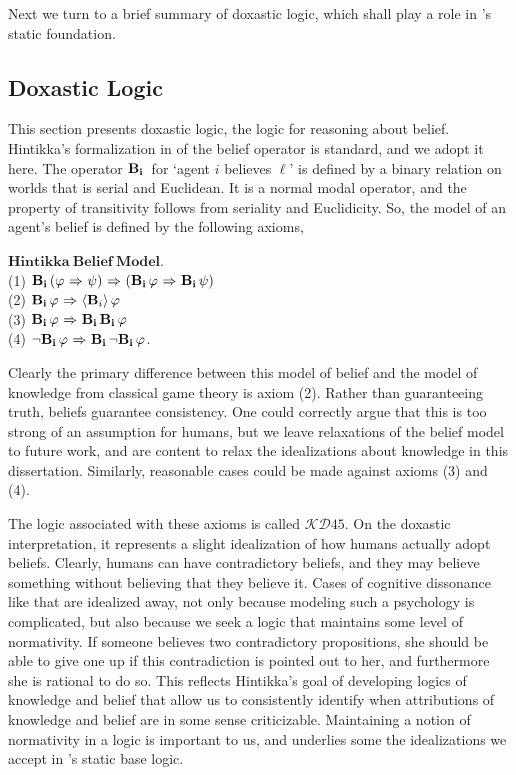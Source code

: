 Next we turn to a brief summary of doxastic logic, which shall play a role in \DASL's static foundation. 

\subsection{Doxastic Logic}
This section presents doxastic logic, the logic for reasoning about belief. Hintikka's formalization in \cite{Hintikka} of the belief operator is standard, and we adopt it here. The operator $\mathbf{B}_{\mathbf{i}}\,$ for `agent $i$ believes $\ell$' is defined by a binary relation on worlds that is serial and Euclidean. It is a normal modal operator, and the property of transitivity follows from seriality and Euclidicity. So, the model of an agent's belief is defined by the following axioms,

$\mathbf{Hintikka\ Belief\ Model}$.\\
(1) $\mathbf{B}_{\mathbf{i}}\,(\varphi {\ \Rightarrow \ } \psi) {\ \Rightarrow \ } (\mathbf{B}_{\mathbf{i}}\,\varphi {\ \Rightarrow \ } \mathbf{B}_{\mathbf{i}}\,\psi)$\\
(2) $\mathbf{B}_{\mathbf{i}}\,\varphi {\ \Rightarrow \ } \langle \mathbf{B}_{i} \rangle\,\varphi$\\
(3) $\mathbf{B}_{\mathbf{i}}\,\varphi {\ \Rightarrow \ } \mathbf{B}_{\mathbf{i}}\,\mathbf{B}_{\mathbf{i}}\,\varphi$\\
(4) ${\neg} \mathbf{B}_{\mathbf{i}}\,\varphi {\ \Rightarrow \ } \mathbf{B}_{\mathbf{i}}\,{\neg}\mathbf{B}_{\mathbf{i}}\,\varphi$.

Clearly the primary difference between this model of belief and the model of knowledge from classical game theory is axiom (2). Rather than guaranteeing truth, beliefs guarantee consistency. One could correctly argue that this is too strong of an assumption for humans, but we leave relaxations of the belief model to future work, and are content to relax the idealizations about knowledge in this dissertation. Similarly, reasonable cases could be made against axioms (3) and (4).

The logic associated with these axioms is called $\mathcal{KD}\mathit{45}$. On the doxastic interpretation, it represents a slight idealization of how humans actually adopt beliefs. Clearly, humans can have contradictory beliefs, and they may believe something without believing that they believe it. Cases of cognitive dissonance like that are idealized away, not only because modeling such a psychology is complicated, but also because we seek a logic that maintains some level of normativity. If someone believes two contradictory propositions, she should be able to give one up if this contradiction is pointed out to her, and furthermore she is rational to do so. This reflects Hintikka's goal of developing logics of knowledge and belief that allow us to consistently identify when attributions of knowledge and belief are in some sense criticizable. Maintaining a notion of normativity in a logic is important to us, and underlies some the idealizations we accept in \DASL's static base logic.

